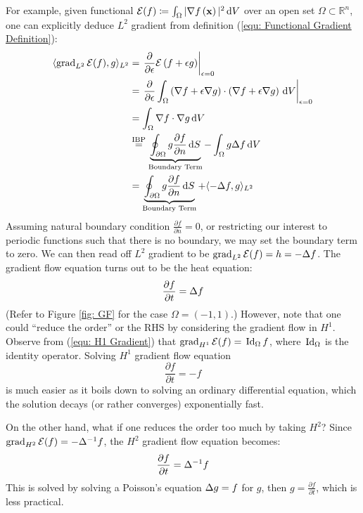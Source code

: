 \documentclass[../dissertation.tex]{subfiles}
\begin{document}
\begin{example}
    For example, given functional $\mathcal{E} (f) \coloneqq \int_{\Omega} |\nabla f \left( \mathbf{x} \right)|^2 \, \text{d} V$ over an open set $\Omega \subset \mathbb{R}^n$,
    one can explicitly deduce $L^2$ gradient from definition (\ref{equ: Functional Gradient Definition}):
    \begin{align*}
        \langle \operatorname{grad}_{L^2} \mathcal{E} (f), g \rangle_{L^2} &= \left.\frac{\partial}{\partial \epsilon} \mathcal{E} \left( f + \epsilon g \right)\right|_{\epsilon=0} \\
            &= \left.\frac{\partial}{\partial \epsilon} \int_{\Omega} \left( \nabla f + \epsilon \nabla g \right) \cdot \left( \nabla f + \epsilon \nabla g \right) \, \text{d} V\right|_{\epsilon=0} \\
                &= \int_{\Omega} \nabla f \cdot \nabla g \, \text{d} V \\
                &\stackrel{\text{IBP}}{=} \underbrace{\oint_{\partial \Omega} g \frac{\partial f}{\partial n} \, \text{d} S}_{\text{Boundary Term}} - \int_{\Omega} g \Delta f \, \text{d} V \\
                &= \underbrace{\oint_{\partial \Omega} g \frac{\partial f}{\partial n} \, \text{d} S}_{\text{Boundary Term}} + \langle -\Delta f, g \rangle_{L^2}
            \end{align*}
            Assuming natural boundary condition $\frac{\partial f}{\partial n} = 0$, or restricting our interest to periodic functions such that there is no boundary, we may set the boundary term to zero.
            We can then read off $L^2$ gradient to be $\operatorname{grad}_{L^2} \mathcal{E} (f) = h = -\Delta f$. 
            The gradient flow equation turns out to be the heat equation:
            \begin{equation}
                \frac{\partial f}{\partial t} = \Delta f
            \end{equation}
            (Refer to Figure \ref{fig: GF} for the case $\Omega = (-1, 1)$.)
            However, note that one could ``reduce the order'' or the RHS by considering the gradient flow in $H^1$.
            Observe from (\ref{equ: H1 Gradient}) that $\operatorname{grad}_{H^1} \mathcal{E} (f) = \, \text{Id}_{\Omega} \, f$, where $\, \text{Id}_{\Omega}$ is the identity operator.
            Solving $H^1$ gradient flow equation
            \begin{equation}
                \frac{\partial f}{\partial t} = -f
    \end{equation}
    is much easier as it boils down to solving an ordinary differential equation,
    which the solution decays (or rather converges) exponentially fast.

    On the other hand, what if one reduces the order too much by taking $H^2$?
    Since $\operatorname{grad}_{H^2} \mathcal{E} (f) = -\Delta^{-1} f$, the $H^2$ gradient flow equation becomes:
    \begin{equation}
        \frac{\partial f}{\partial t} = \Delta^{-1} f
    \end{equation}
    This is solved by solving a Poisson's equation $\Delta g = f$ for $g$,
    then $g = \frac{\partial f}{\partial t}$,
    which is less practical.
\end{example}
\end{document}
